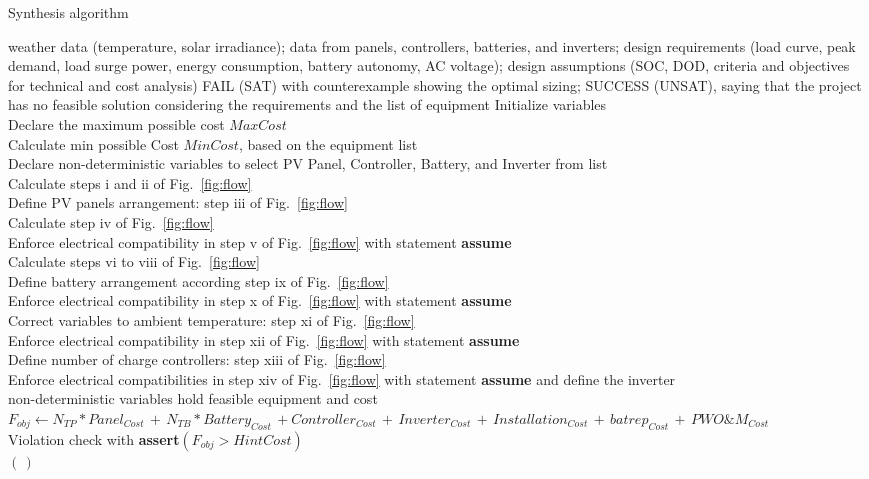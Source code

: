 \documentclass[runningheads]{llncs}
\begin{document}
 \begin{algorithm}[h]
 \caption{Synthesis algorithm}
 \begin{algorithmic}[1]
 \renewcommand{\algorithmicrequire}{\textbf{Input:}}
 \renewcommand{\algorithmicensure}{\textbf{Output:}}
 \REQUIRE weather data (temperature, solar irradiance); data from panels, controllers, batteries, and inverters; design requirements (load curve, peak demand, load surge power, energy consumption, battery autonomy, AC voltage); design assumptions (SOC, DOD, criteria and objectives for technical and cost analysis)
 \ENSURE FAIL (SAT) with counterexample showing the optimal sizing; SUCCESS (UNSAT), saying that the project has no feasible solution considering the requirements and the list of equipment
 \STATE Initialize variables \\
 \STATE Declare the maximum possible cost $MaxCost$ \\
 \STATE Calculate min possible Cost $MinCost$, based on the equipment list \\
 	\STATE Declare non-deterministic variables to select PV Panel, Controller, Battery, and Inverter from list \\
 	\STATE Calculate steps i and ii of Fig.~\ref{fig:flow} \\
	\STATE Define PV panels arrangement: step iii of Fig.~\ref{fig:flow} \\
	\STATE Calculate  step iv of Fig.~\ref{fig:flow} \\
	\STATE Enforce electrical compatibility in step v of Fig.~\ref{fig:flow} with statement \textbf{assume} \\
	\STATE Calculate steps vi to viii of Fig.~\ref{fig:flow} \\
	\STATE Define battery arrangement according step ix of Fig.~\ref{fig:flow} \\
	\STATE Enforce electrical compatibility in step x of Fig.~\ref{fig:flow} with statement \textbf{assume} \\
	\STATE Correct variables to ambient temperature: step xi of Fig.~\ref{fig:flow} \\
	\STATE Enforce electrical compatibility in step xii of Fig.~\ref{fig:flow} with statement \textbf{assume} \\
	\STATE Define number of charge controllers: step xiii of Fig.~\ref{fig:flow}\\
	\STATE Enforce electrical compatibilities in step xiv of Fig.~\ref{fig:flow} with statement \textbf{assume} and define the inverter \\
	\STATE non-deterministic variables hold feasible equipment and cost \\
	\STATE $F_{obj} \leftarrow N_{TP}*Panel_{Cost} \, + \, N_{TB}*Battery_{Cost} \, + Controller_{Cost} \, + \, Inverter_{Cost} \, + \, Installation_{Cost} \, + \, batrep_{Cost} \, + \, PWO\&M_{Cost}$ \\
	\STATE Violation check with \textbf{assert}$(F_{obj} > HintCost)$ \\
 \ENDFOR
 \RETURN $(\,)$ 
 \end{algorithmic} 
 \label{alg:opt-algorithm}
 \end{algorithm}
\end{document}
